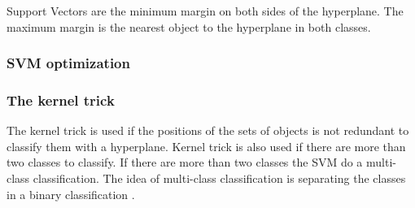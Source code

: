 Support Vectors are the minimum margin on both sides of the hyperplane. The maximum margin is the nearest object to the hyperplane in both classes.

\subsubsection*{SVM optimization}

\subsubsection*{The kernel trick}

The kernel trick is used if the positions of the sets of objects is not redundant to classify them with a hyperplane. Kernel trick is also used if there are more than two classes to classify. If there
are more than two classes the SVM do a multi-class classification. The idea of multi-class classification is separating the classes in a binary classification \cite{tzotsos2008support}.
